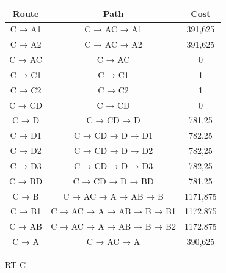 \documentclass[a4paper, titlepage,12pt]{article}
\begin{document}
		\begin{figure}[H]
			\begin{center}
			\begin{tabular}{|c|c|c|}


				\hline
Route & Path & Cost \\
\hline
C → A1 & C → AC → A1 & 391,625 \\
\hline
C → A2 & C → AC → A2 & 391,625 \\
\hline
C → AC & C → AC & 0 \\
\hline
C → C1 & C → C1 & 1 \\
\hline
C → C2 & C → C2 & 1 \\
\hline
C → CD & C → CD & 0 \\
\hline
C → D & C → CD → D & 781,25 \\
\hline
C → D1 & C → CD → D → D1 & 782,25 \\
\hline
C → D2 & C → CD → D → D2 & 782,25 \\
\hline
C → D3 & C → CD → D → D3 & 782,25 \\
\hline
C → BD & C → CD → D → BD & 781,25 \\
\hline
C → B & C → AC → A → AB → B & 1171,875 \\
\hline
C → B1 & C → AC → A → AB → B → B1 & 1172,875 \\
\hline
C → AB & C → AC → A → AB → B → B2 & 1172,875 \\
\hline
C → A & C → AC → A & 390,625 \\
\hline
			\end{tabular}
			\caption{RT-C}
			\end{center}
		\end{figure}
\end{document}
